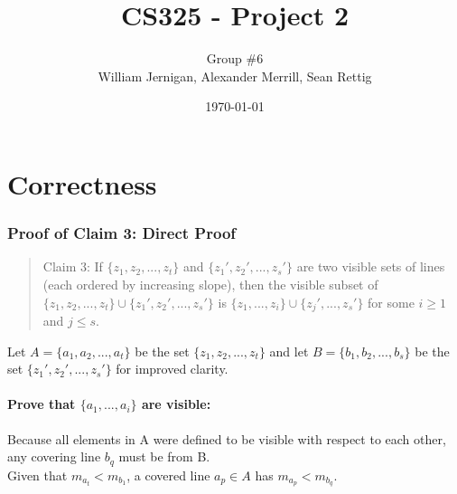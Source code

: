\documentclass{article}
\title{CS325 - Project 2}
\author{Group \#6 \\ William Jernigan, Alexander Merrill, Sean Rettig}
\date{\today}
\begin{document}
\maketitle

\part*{Correctness}
\section*{Proof of Claim 3: Direct Proof}

\begin{quote}
Claim 3: If $\{z_{1},z_{2},...,z_{t}\}$ and $\{z_{1}',z_{2}',...,z_{s}'\}$ are two visible sets of lines (each ordered by increasing slope), then the visible subset of $\{z_{1},z_{2},...,z_{t}\}\cup\{z_{1}',z_{2}',...,z_{s}'\}$ is $\{z_{1},...,z_{i}\}\cup\{z_{j}',...,z_{s}'\}$ for some $i \geq 1$ and $j \leq s$.
\end{quote}
Let $A = \{a_{1},a_{2},...,a_{t}\}$ be the set $\{z_{1},z_{2},...,z_{t}\}$ and let $B = \{b_{1},b_{2},...,b_{s}\}$ be the set $\{z_{1}',z_{2}',...,z_{s}'\}$ for improved clarity.

\subsection*{Prove that $\{a_{1},...,a_{i}\}$ are visible:}
    Because all elements in A were defined to be visible with respect to each other, any covering line $b_{q}$ must be from B.\\
    Given that $m_{a_{t}} < m_{b_{1}}$, a covered line $a_{p} \in A$ has $m_{a_p} < m_{b_q}$.
    
\end{document}
